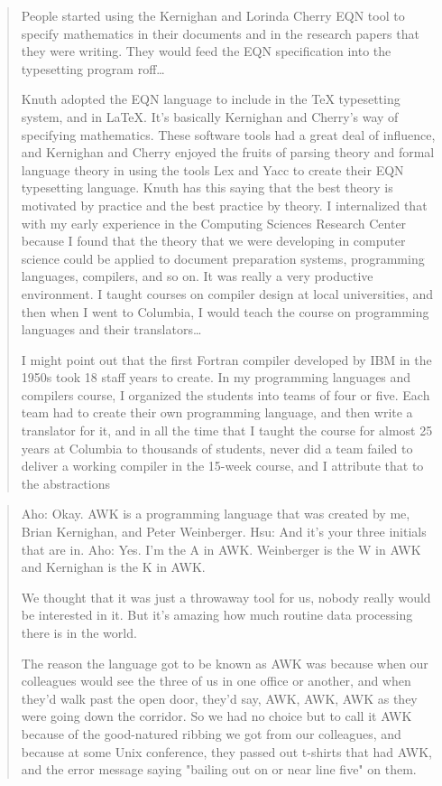 
\begin{quotation}
People started using the Kernighan and Lorinda Cherry EQN tool to specify
mathematics in their documents and in the research papers that they were writing. They would feed the
EQN specification into the typesetting program roff\dots

Knuth adopted the EQN language to
include in the TeX typesetting system, and in LaTeX. It's basically Kernighan and Cherry's way of
specifying mathematics. These software tools had a great deal of influence, and Kernighan and Cherry
enjoyed the fruits of parsing theory and formal language theory in using the tools Lex and Yacc to create
their EQN typesetting language. Knuth has this saying that the best theory is motivated by practice and
the best practice by theory. I internalized that with my early experience in the Computing Sciences
Research Center because I found that the theory that we were developing in computer science could be
applied to document preparation systems, programming languages, compilers, and so on. It was really a
very productive environment. I taught courses on compiler design at local universities, and then when I
went to Columbia, I would teach the course on programming languages and their translators\dots

I might point out that the first Fortran compiler developed by IBM in the 1950s took 18 staff years to
create. In my programming languages and compilers course, I organized the students into teams of four
or five. Each team had to create their own programming language, and then write a translator for it, and in
all the time that I taught the course for almost 25 years at Columbia to thousands of students, never did a
team failed to deliver a working compiler in the 15-week course, and I attribute that to the abstractions
\cite{aho_oral_history_2022}
\end{quotation}

\begin{quotation}
Aho: Okay. AWK is a programming language that was created by me, Brian Kernighan, and Peter
Weinberger.
Hsu: And it's your three initials that are in.
Aho: Yes. I'm the A in AWK. Weinberger is the W in AWK and Kernighan is the K in AWK. 

We thought
that it was just a throwaway tool for us, nobody really would be interested in it. But it's amazing how much
routine data processing there is in the world.

The reason the
language got to be known as AWK was because when our colleagues would see the three of us in one
office or another, and when they'd walk past the open door, they'd say, AWK, AWK, AWK as they were
going down the corridor. So we had no choice but to call it AWK because of the good-natured ribbing we
got from our colleagues, and because at some Unix conference, they passed out t-shirts that had AWK,
and the error message saying "bailing out on or near line five" on them.
\end{quotation}

